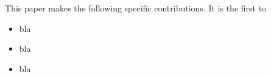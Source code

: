 
This paper makes the following specific contributions. It is the first to
\begin{itemize}
\item bla
\item bla
\item bla
\end{itemize}

